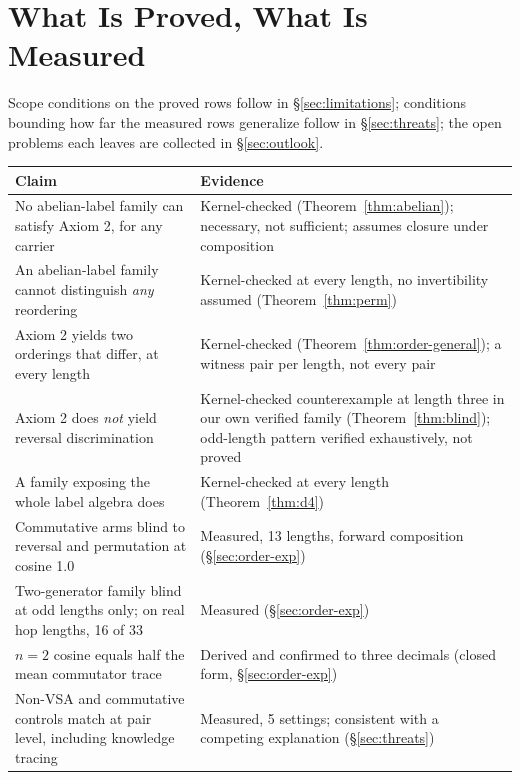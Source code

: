 \documentclass[10pt]{article}
\begin{document}
\section{What Is Proved, What Is Measured}
\label{sec:proved-measured}

Scope conditions on the proved rows follow in \S\ref{sec:limitations}; conditions bounding how far the measured rows generalize follow in \S\ref{sec:threats}; the open problems each leaves are collected in \S\ref{sec:outlook}.

\begin{table}[h]
\centering
\small
\begin{tabular}{p{}p{}}
\toprule
Claim & Evidence \\
\midrule
No abelian-label family can satisfy Axiom 2, for any carrier & Kernel-checked (Theorem~\ref{thm:abelian}); necessary, not sufficient; assumes closure under composition \\
An abelian-label family cannot distinguish \emph{any} reordering & Kernel-checked at every length, no invertibility assumed (Theorem~\ref{thm:perm}) \\
Axiom 2 yields two orderings that differ, at every length & Kernel-checked (Theorem~\ref{thm:order-general}); a witness pair per length, not every pair \\
Axiom 2 does \emph{not} yield reversal discrimination & Kernel-checked counterexample at length three in our own verified family (Theorem~\ref{thm:blind}); odd-length pattern verified exhaustively, not proved \\
A family exposing the whole label algebra does & Kernel-checked at every length (Theorem~\ref{thm:d4}) \\
\midrule
Commutative arms blind to reversal and permutation at cosine 1.0 & Measured, 13 lengths, forward composition (\S\ref{sec:order-exp}) \\
Two-generator family blind at odd lengths only; on real hop lengths, 16 of 33 & Measured (\S\ref{sec:order-exp}) \\
$n=2$ cosine equals half the mean commutator trace & Derived and confirmed to three decimals (closed form, \S\ref{sec:order-exp}) \\
Non-VSA and commutative controls match at pair level, including knowledge tracing & Measured, 5 settings; consistent with a competing explanation (\S\ref{sec:threats}) \\
\bottomrule
\end{tabular}
\end{table}
\end{document}

